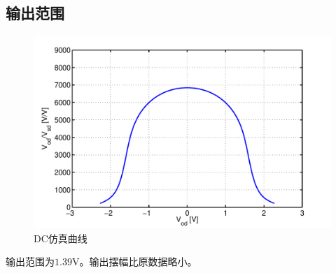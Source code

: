 \documentclass[a4paper]{article}
\newcommand{\uV}{\si{\volt}}
\begin{document}
\subsection{输出范围}
\begin{figure}[htb]
    \begin{center}
        \includegraphics[width=\textwidth]{slow/dc.pdf}
    \end{center}
    \caption{DC仿真曲线}
    \label{slowdc}
\end{figure}
输出范围为$1.39\uV$。输出摆幅比原数据略小。
\newpage
\clearpage
\end{document}
